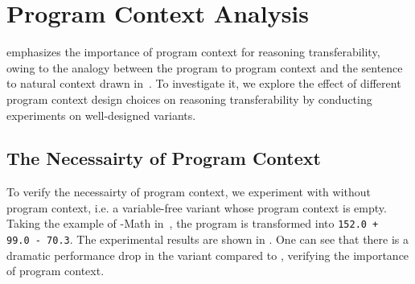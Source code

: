 \section{Program Context Analysis}\label{sec:append_var}

\ours emphasizes the importance of program context for reasoning transferability, owing to the analogy between the program to program context and the sentence to natural context drawn in~.
To investigate it, we explore the effect of different program context design choices on reasoning transferability by conducting experiments on well-designed \oursmath variants.

\subsection{The Necessairty of Program Context}

\begin{table}[tbp]
  \small
  \centering
  \caption{The DROP performance with different numbers of irrelevant variables in \oursbartmath pre-training.}
  \label{tab:irr}\end{table}

To verify the necessairty of program context, we experiment with \oursmath without program context, i.e. a variable-free \oursmath variant whose program context is empty.
Taking the example of \ours-Math in~, the program is transformed into \texttt{\small 152.0\,+\,99.0\,-\,70.3}.
The experimental results are shown in .
One can see that there is a dramatic performance drop in the variant compared to \oursmath, verifying the importance of program context.

